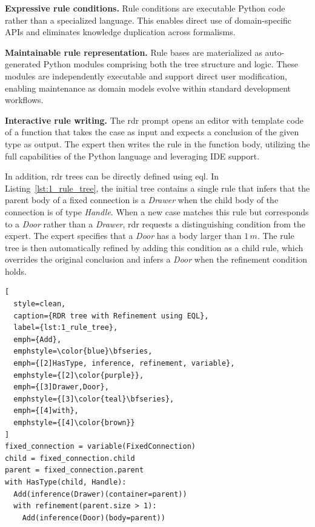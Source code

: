 \documentclass{article}
\begin{document}
\textbf{Expressive rule conditions.} Rule conditions are executable Python code rather than a specialized language. This enables direct use of domain-specific APIs and eliminates knowledge duplication across formalisms.

\textbf{Maintainable rule representation.} Rule bases are materialized as auto-generated Python modules comprising both the tree structure and logic. These modules are independently executable and support direct user modification, enabling maintenance as domain models evolve within standard development workflows.

\textbf{Interactive rule writing.} The \ac{rdr} prompt opens an editor with template code of a function that takes the case as input and expects a conclusion of the given type as output. The expert then writes the rule in the function body, utilizing the full capabilities of the Python language and leveraging IDE support.

In addition, \ac{rdr} trees can be directly defined using \ac{eql}. In Listing~\ref{lst:1_rule_tree}, the initial tree contains a single rule that infers that the parent body of a fixed connection is a \textit{Drawer} when the child body of the connection is of type \textit{Handle}. When a new case matches this rule but corresponds to a \textit{Door} rather than a \textit{Drawer}, \ac{rdr} requests a distinguishing condition from the expert. The expert specifies that a \textit{Door} has a body larger than $1\,m$. The rule tree is then automatically refined by adding this condition as a child rule, which overrides the original conclusion and infers a \textit{Door} when the refinement condition holds.

\begin{lstlisting}[
  style=clean,
  caption={RDR tree with Refinement using EQL},
  label={lst:1_rule_tree},
  emph={Add},
  emphstyle=\color{blue}\bfseries,
  emph={[2]HasType, inference, refinement, variable},
  emphstyle={[2]\color{purple}},
  emph={[3]Drawer,Door},
  emphstyle={[3]\color{teal}\bfseries},
  emph={[4]with},
  emphstyle={[4]\color{brown}}
]
fixed_connection = variable(FixedConnection)
child = fixed_connection.child
parent = fixed_connection.parent
with HasType(child, Handle):
  Add(inference(Drawer)(container=parent))
  with refinement(parent.size > 1):
    Add(inference(Door)(body=parent))
\end{lstlisting}

\end{document}
